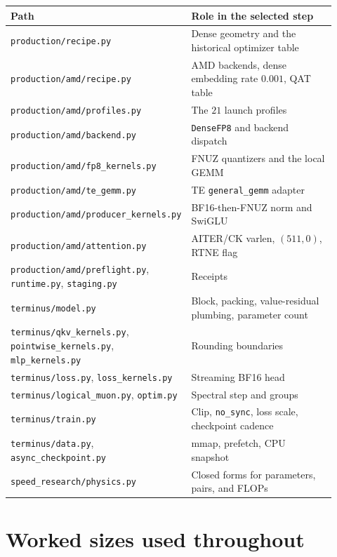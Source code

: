 \documentclass[11pt]{article}
\DeclareRobustCommand{\code}[1]{\texttt{#1}}
\begin{document}
\begin{center}
\small
\begin{tabular}{@{}L{0.42\linewidth}L{0.50\linewidth}@{}}
\toprule
Path & Role in the selected step \\
\midrule
\code{production/recipe.py} & Dense geometry and the historical optimizer table \\
\code{production/amd/recipe.py} & AMD backends, dense embedding rate \(0.001\), QAT table \\
\code{production/amd/profiles.py} & The \(21\) launch profiles \\
\code{production/amd/backend.py} & \code{DenseFP8} and backend dispatch \\
\code{production/amd/fp8\_kernels.py} & FNUZ quantizers and the local GEMM \\
\code{production/amd/te\_gemm.py} & TE \code{general\_gemm} adapter \\
\code{production/amd/producer\_kernels.py} & BF16-then-FNUZ norm and SwiGLU \\
\code{production/amd/attention.py} & AITER/CK varlen, \((511,0)\), RTNE flag \\
\code{production/amd/preflight.py}, \code{runtime.py}, \code{staging.py} & Receipts \\
\code{terminus/model.py} & Block, packing, value-residual plumbing, parameter count \\
\code{terminus/qkv\_kernels.py}, \code{pointwise\_kernels.py}, \code{mlp\_kernels.py} & Rounding boundaries \\
\code{terminus/loss.py}, \code{loss\_kernels.py} & Streaming BF16 head \\
\code{terminus/logical\_muon.py}, \code{optim.py} & Spectral step and groups \\
\code{terminus/train.py} & Clip, \code{no\_sync}, loss scale, checkpoint cadence \\
\code{terminus/data.py}, \code{async\_checkpoint.py} & mmap, prefetch, CPU snapshot \\
\code{speed\_research/physics.py} & Closed forms for parameters, pairs, and FLOPs \\
\bottomrule
\end{tabular}
\end{center}

\appendix
\section{Worked sizes used throughout}
\end{document}
